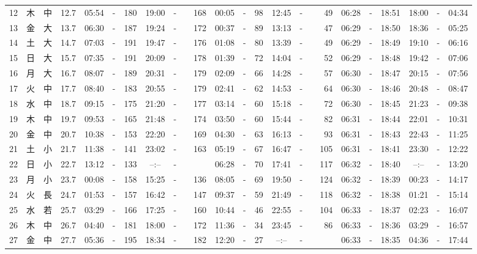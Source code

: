 \documentclass[12pt,a4j]{jsarticle}
\begin{document}
\begin{table}[htbp]
\begin{center}
{\begin{tabular}{|rc|cr|ccrccr|ccrccr|ccc|ccc|}
12 & 木 & 中 & 12.7 &  05:54 &-& 180 &  19:00 &-& 168 &  00:05 &-&  98 &  12:45 &-&  49 & 06:28 & -& 18:51 & 18:00 & -& 04:34 \\
13 & 金 & 大 & 13.7 &  06:30 &-& 187 &  19:24 &-& 172 &  00:37 &-&  89 &  13:13 &-&  47 & 06:29 & -& 18:50 & 18:36 & -& 05:25 \\
14 & 土 & 大 & 14.7 &  07:03 &-& 191 &  19:47 &-& 176 &  01:08 &-&  80 &  13:39 &-&  49 & 06:29 & -& 18:49 & 19:10 & -& 06:16 \\
15 & 日 & 大 & 15.7 &  07:35 &-& 191 &  20:09 &-& 178 &  01:39 &-&  72 &  14:04 &-&  52 & 06:29 & -& 18:48 & 19:42 & -& 07:06 \\
16 & 月 & 大 & 16.7 &  08:07 &-& 189 &  20:31 &-& 179 &  02:09 &-&  66 &  14:28 &-&  57 & 06:30 & -& 18:47 & 20:15 & -& 07:56 \\
17 & 火 & 中 & 17.7 &  08:40 &-& 183 &  20:55 &-& 179 &  02:41 &-&  62 &  14:53 &-&  64 & 06:30 & -& 18:46 & 20:48 & -& 08:47 \\
18 & 水 & 中 & 18.7 &  09:15 &-& 175 &  21:20 &-& 177 &  03:14 &-&  60 &  15:18 &-&  72 & 06:30 & -& 18:45 & 21:23 & -& 09:38 \\
19 & 木 & 中 & 19.7 &  09:53 &-& 165 &  21:48 &-& 174 &  03:50 &-&  60 &  15:44 &-&  82 & 06:31 & -& 18:44 & 22:01 & -& 10:31 \\
20 & 金 & 中 & 20.7 &  10:38 &-& 153 &  22:20 &-& 169 &  04:30 &-&  63 &  16:13 &-&  93 & 06:31 & -& 18:43 & 22:43 & -& 11:25 \\
21 & 土 & 小 & 21.7 &  11:38 &-& 141 &  23:02 &-& 163 &  05:19 &-&  67 &  16:47 &-& 105 & 06:31 & -& 18:41 & 23:30 & -& 12:22 \\
22 & 日 & 小 & 22.7 &  13:12 &-& 133 &  --:-- &-&~~~~~ &  06:28 &-&  70 &  17:41 &-& 117 & 06:32 & -& 18:40 & --:-- & -& 13:20 \\
23 & 月 & 小 & 23.7 &  00:08 &-& 158 &  15:25 &-& 136 &  08:05 &-&  69 &  19:50 &-& 124 & 06:32 & -& 18:39 & 00:23 & -& 14:17 \\
24 & 火 & 長 & 24.7 &  01:53 &-& 157 &  16:42 &-& 147 &  09:37 &-&  59 &  21:49 &-& 118 & 06:32 & -& 18:38 & 01:21 & -& 15:14 \\
25 & 水 & 若 & 25.7 &  03:29 &-& 166 &  17:25 &-& 160 &  10:44 &-&  46 &  22:55 &-& 104 & 06:33 & -& 18:37 & 02:23 & -& 16:07 \\
26 & 木 & 中 & 26.7 &  04:40 &-& 181 &  18:00 &-& 172 &  11:36 &-&  34 &  23:45 &-&  86 & 06:33 & -& 18:36 & 03:29 & -& 16:57 \\
27 & 金 & 中 & 27.7 &  05:36 &-& 195 &  18:34 &-& 182 &  12:20 &-&  27 &  --:-- &-&~~~~~ & 06:33 & -& 18:35 & 04:36 & -& 17:44 \\

\end{tabular}}
\end{center}
\end{table}
\end{document}
